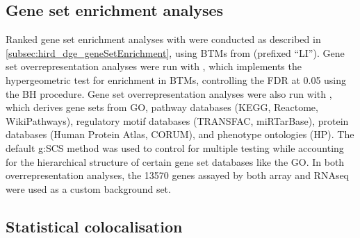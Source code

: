 \subsection{Gene set enrichment analyses}
\label{subsec:hird_reQTL_geneSetEnrichment}

Ranked gene set enrichment analyses with  were conducted as described in \cref{subsec:hird_dge_geneSetEnrichment},
using \glspl{BTM} from \textcite{li2013MolecularSignaturesAntibody} (prefixed \enquote{LI}).
%
Gene set overrepresentation analyses were run with 
 \autocite{weiner3rd2016TmodPackageGeneral}, which implements the hypergeometric test for enrichment in \glspl{BTM}, controlling the \gls{FDR} at 0.05 using the \gls{BH} procedure.
Gene set overrepresentation analyses were also run with 
 \autocite{raudvere2019ProfilerWebServer},
which derives gene sets from
    \gls{GO},
    pathway databases (KEGG, Reactome, WikiPathways),
    regulatory motif databases (TRANSFAC, miRTarBase),
    protein databases (Human Protein Atlas, CORUM),
    and phenotype ontologies (HP).
The default  g:SCS method was used to control for multiple testing while accounting for the hierarchical structure of certain gene set databases like the \gls{GO}.
In both overrepresentation analyses, 
the \num{13570} genes assayed by both array and \gls{RNAseq} were used as a custom background set.

\subsection{Statistical colocalisation}
\label{subsec:hird_reQTL_coloc}

